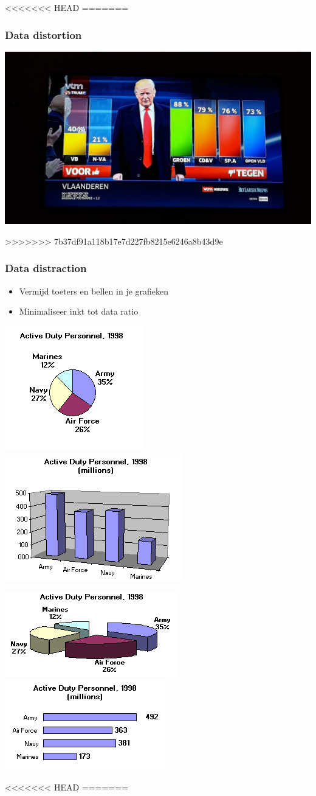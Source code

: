 \documentclass{beamer}
\begin{document}
\begin{frame}
<<<<<<< HEAD
=======
  \frametitle{Data distortion}

  \begin{center}
    \includegraphics[width=.8\textwidth]{img/les2-03-2}
  \end{center}
\end{frame}
\begin{frame}
>>>>>>> 7b37df91a118b17e7d227fb8215e6246a8b43d9e
  \frametitle{Data distraction}

  \begin{itemize}
    \item Vermijd toeters en bellen in je grafieken
    \item Minimaliseer inkt tot data ratio
  \end{itemize}

  \centering
  \includegraphics[width=.4\textwidth]{img/les2-04}
  \includegraphics[width=.4\textwidth]{img/les2-05}

  \includegraphics[width=.4\textwidth]{img/les2-06}
  \includegraphics[width=.4\textwidth]{img/les2-07}
\end{frame}
<<<<<<< HEAD
=======
\end{document}

